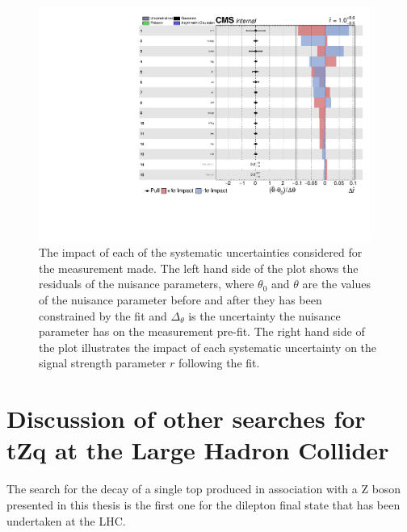 %
%
%
% 
% 
%

\begin{figure}[htbp]
\begin{center}
\includegraphics[width=0.97\textwidth]{figs/results/systematicsImpact.pdf}
\caption{The impact of each of the systematic uncertainties considered for the measurement made. The left hand side of the plot shows the residuals of the nuisance parameters, where $\theta_{0}$ and $\theta$ are the values of the nuisance parameter before and after they has been constrained by the fit and $\Delta_{\theta}$ is the uncertainty the nuisance parameter has on the measurement pre-fit.
The right hand side of the plot illustrates the impact of each systematic uncertainty on the signal strength parameter $r$ following the fit.
}
\label{fig:systematicsPull}
\end{center}
\end{figure}

\section{Discussion of other searches for tZq at the Large Hadron Collider}
The search for the decay of a single top produced in association with a Z boson presented in this thesis is the first one for the dilepton final state that has been undertaken at the LHC.

